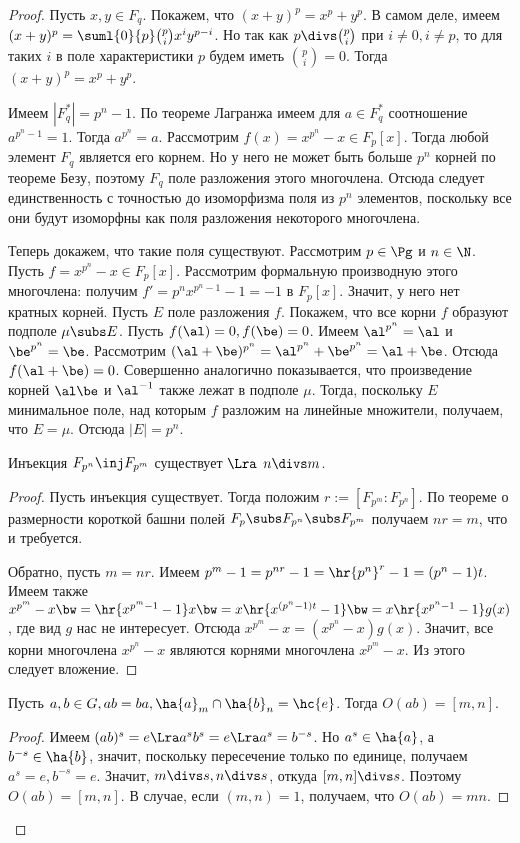 \documentclass[a4paper]{article}
\begin{document}
\begin{proof}
Пусть $x,y \in F_q$. Покажем, что $(x+y)^p=x^p+y^p$. В самом  деле, имеем
$(x+y)^p=\suml{0}{p}\binom{p}{i}x^iy^{p-i}$. Но так как $p \divs \binom{p}{i}$ при $i \neq 0, i \neq p$, то
для таких $i$ в поле характеристики $p$ будем иметь $\binom{p}{i}=0$. Тогда $(x+y)^p=x^p+y^p$.

Имеем $|F_q^*|=p^n-1$. По теореме Лагранжа имеем для $a \in F_q^*$  соотношение $a^{p^n-1}=1$. Тогда
$a^{p^n}=a$. Рассмотрим $f(x)=x^{p^n}-x \in F_p[x]$. Тогда любой элемент $F_q$ является его корнем. Но у него
не может быть больше $p^n$ корней по теореме Безу, поэтому $F_q$ поле разложения этого многочлена. Отсюда
следует единственность с точностью до изоморфизма поля из $p^n$ элементов, поскольку все они будут изоморфны
как поля разложения некоторого многочлена.

Теперь докажем, что такие поля существуют. Рассмотрим  $p \in \Pg$ и $n \in \N$. Пусть $f=x^{p^n}-x \in
F_p[x]$. Рассмотрим формальную производную этого многочлена: получим $f'=p^nx^{p^n-1}-1=-1$ в $F_p[x]$.
Значит, у него нет кратных корней. Пусть $E$ поле разложения $f$. Покажем, что все корни $f$ образуют
подполе $\mu \subs E$. Пусть $f(\al)=0, f(\be)=0$. Имеем $\al^{p^n}=\al$ и $\be^{p^n}=\be$. Рассмотрим
$(\al+\be)^{p^n}=\al^{p^n}+\be^{p^n}=\al+\be$. Отсюда $f(\al+\be)=0$. Совершенно аналогично показывается, что
произведение корней $\al\be$ и $\al^{-1}$ также лежат в подполе $\mu$. Тогда, поскольку $E$ минимальное
поле, над которым $f$ разложим на линейные множители, получаем, что $E = \mu$. Отсюда $|E|=p^n$.

\begin{theorem}
Инъекция $F_{p^n} \inj F_{p^m}$ существует $\Lra$ $n\divs m$.
\end{theorem}
\begin{proof}
Пусть инъекция существует. Тогда положим $r:=[F_{p^m}:F_{p^n}]$.  По теореме о размерности короткой башни
полей $F_p \subs F_{p^n} \subs F_{p^m}$ получаем $nr=m$, что и требуется.

Обратно, пусть $m=nr$. Имеем $p^m-1=p^{nr}-1=\hr{p^n}^r-1=(p^n-1)t$. Имеем также $x^{p^m}-x \bw=
\hr{x^{p^m-1}-1} x \bw= x\hr{x^{(p^n-1)t}-1} \bw= x\hr{x^{p^n-1}-1}g(x)$,  где вид $g$ нас не интересует. Отсюда
$x^{p^m}-x=(x^{p^n}-x)g(x)$. Значит, все корни многочлена $x^{p^n}-x$ являются корнями многочлена $x^{p^m}-x$.
Из этого следует вложение.
\end{proof}

\begin{theorem}
Пусть $a,b \in G, ab=ba, \ha{a}_m\cap\ha{b}_n=\hc{e}$. Тогда $O(ab)=[m,n]$.
\end{theorem}
\begin{proof}
Имеем $(ab)^s=e \Lra a^sb^s=e \Lra a^s=b^{-s}$. Но
$a^s \in \ha{a}$, а $b^{-s} \in \ha{b}$, значит, поскольку
пересечение только по единице, получаем $a^s=e, b^{-s}=e$. Значит,
$m \divs s, n \divs s$, откуда $[m,n] \divs s$. Поэтому
$O(ab)=[m,n]$. В случае, если $(m,n)=1$, получаем, что $O(ab)=mn$.
\end{proof}


\end{proof}
\end{document}
